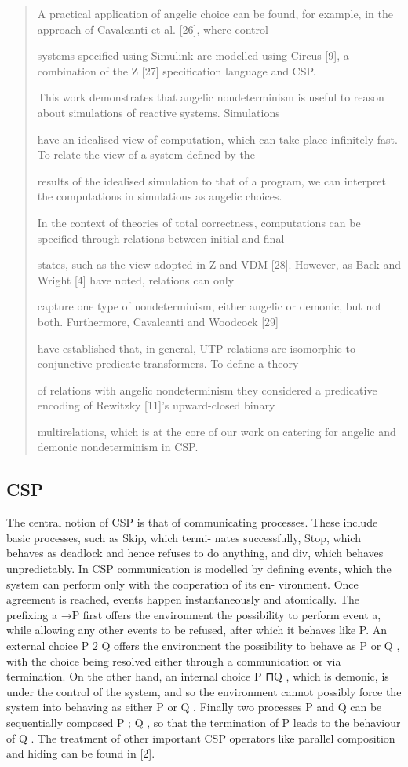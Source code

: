 \documentclass[11pt]{article}
\begin{document}
\begin{quote}\small\raggedright
A practical application of angelic choice can be found, for example, in the approach of Cavalcanti et al. [26], where control
\par
systems specified using Simulink are modelled using Circus [9], a combination of the Z [27] specification language and CSP.
\par
This work demonstrates that angelic nondeterminism is useful to reason about simulations of reactive systems. Simulations
\par
have an idealised view of computation, which can take place infinitely fast. To relate the view of a system defined by the
\par
results of the idealised simulation to that of a program, we can interpret the computations in simulations as angelic choices.
\par
In the context of theories of total correctness, computations can be specified through relations between initial and final
\par
states, such as the view adopted in Z and VDM [28]. However, as Back and Wright [4] have noted, relations can only
\par
capture one type of nondeterminism, either angelic or demonic, but not both. Furthermore, Cavalcanti and Woodcock [29]
\par
have established that, in general, UTP relations are isomorphic to conjunctive predicate transformers. To define a theory
\par
of relations with angelic nondeterminism they considered a predicative encoding of Rewitzky [11]’s upward-closed binary
\par
multirelations, which is at the core of our work on catering for angelic and demonic nondeterminism in CSP.
\end{quote}

\subsection{CSP}
The central notion of CSP is that of communicating processes. These include basic processes, such as Skip, which termi- nates successfully, Stop, which behaves as deadlock and hence refuses to do anything, and div, which behaves unpredictably. In CSP communication is modelled by defining events, which the system can perform only with the cooperation of its en- vironment. Once agreement is reached, events happen instantaneously and atomically. The prefixing a →P first offers the environment the possibility to perform event a, while allowing any other events to be refused, after which it behaves like P. An external choice P 2 Q offers the environment the possibility to behave as P or Q , with the choice being resolved either through a communication or via termination. On the other hand, an internal choice P ⊓Q , which is demonic, is under the control of the system, and so the environment cannot possibly force the system into behaving as either P or Q . Finally two processes P and Q can be sequentially composed P ; Q , so that the termination of P leads to the behaviour of Q . The treatment of other important CSP operators like parallel composition and hiding can be found in [2].
\end{document}
